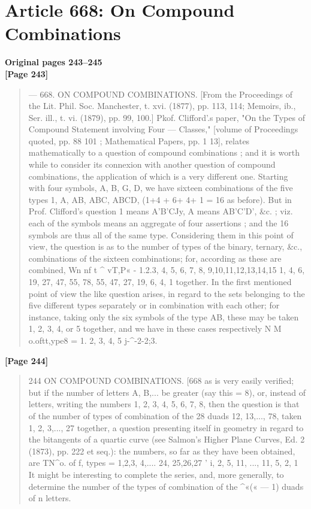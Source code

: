 \documentclass[11pt,a4paper]{book}
\begin{document}
\newpage

\section*{Article 668: On Compound Combinations}
\textbf{Original pages 243--245}\\[0.3cm]

\textbf{[Page 243]}\\[0.2cm]
\begin{quote}
---
668.
ON COMPOUND COMBINATIONS.
[From the Proceedings of the Lit. Phil. Soc. Manchester, t. xvi. (1877), pp. 113, 114;
Memoirs, ib., Ser. ill., t. vi. (1879), pp. 99, 100.]
Pkof. Clifford'.s paper, "On the Types of Compound Statement involving Four
---
Classes," [volume of Proceedings quoted, pp. 88 101 ; Mathematical Papers, pp. 1 13],
relates mathematically to a question of compound combinations ; and it is worth while
to consider its connexion with another question of compound combinations, the application
of which is a very different one.
Starting with four symbols, A, B, G, D, we have sixteen combinations of the
five types 1, A, AB, ABC, ABCD, (1+4 + 6+ 4+ 1 = 16 as before). But in Prof.
Clifford's question 1 means A'B'CJy, A means AB'C'D', \&c. ; viz. each of the symbols
means an aggregate of four assertions ; and the 16 symbols are thus all of the same
type. Considering them in this point of view, the question is as to the number of
types of the binary, ternary, \&c., combinations of the sixteen combinations; for,
according as these are combined,
Wn nf t \textasciicircum{} vT,P« - 1.2.3, 4, 5, 6, 7, 8, 9,10,11,12,13,14,15
1, 4, 6, 19, 27, 47, 55, 78, 55, 47, 27, 19, 6, 4, 1
together.
In the first mentioned point of view the like question arises, in regard to the
sets belonging to the five different types separately or in combination with each other;
for instance, taking only the six symbols of the type AB, these may be taken 1, 2,
3, 4, or 5 together, and we have in these cases respectively
N M o.oftt,ype8 = 1. 2, 3, 4, 5
j-\textasciicircum{}-2-2;3.
\end{quote}

\textbf{[Page 244]}\\[0.2cm]
\begin{quote}
244 ON COMPOUND COMBINATIONS. [668
as is very easily verified; but if the number of letters A, B,... be greater (say this
= 8), or, instead of letters, writing the numbers 1, 2, 3, 4, 5, 6, 7, 8, then the question
is that of the number of types of combination of the 28 duads 12, 13,..., 78, taken
1, 2, 3,..., 27 together, a question presenting itself in geometry in regard to the
bitangents of a quartic curve (see Salmon's Higher Plane Curves, Ed. 2 (1873),
pp. 222 et seq.): the numbers, so far as they have been obtained, are
TN\textasciicircum{}o. of f, types = 1,2,3, 4,.... 24, 25,26,27
'
i, 2, 5, 11, ..., 11, 5, 2, 1
It might be interesting to complete the series, and, more generally, to determine
the number of the types of combination of the \textasciicircum{}«(« --- 1) duads of n letters.
\end{quote}
\end{document}
